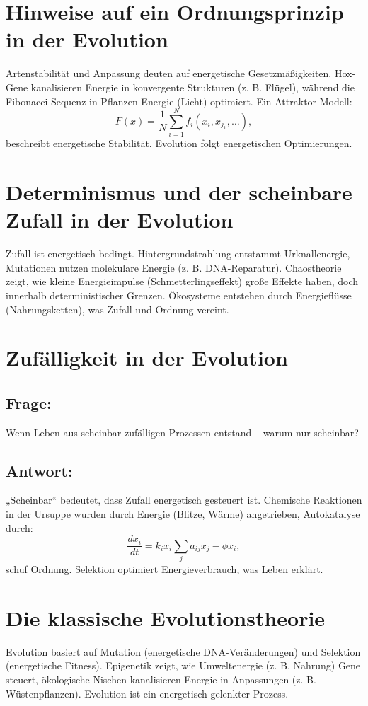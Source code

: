 \documentclass{article}
\begin{document}
	\section{Hinweise auf ein Ordnungsprinzip in der Evolution}
	Artenstabilität und Anpassung deuten auf energetische Gesetzmäßigkeiten. Hox-Gene kanalisieren Energie in konvergente Strukturen (z. B. Flügel), während die Fibonacci-Sequenz in Pflanzen Energie (Licht) optimiert. Ein Attraktor-Modell:
	\begin{equation}
		F(x) = \frac{1}{N} \sum_{i=1}^N f_i(x_i, x_{j_1}, \ldots),
	\end{equation}
	beschreibt energetische Stabilität. Evolution folgt energetischen Optimierungen.
	
	\section{Determinismus und der scheinbare Zufall in der Evolution}
	Zufall ist energetisch bedingt. Hintergrundstrahlung entstammt Urknallenergie, Mutationen nutzen molekulare Energie (z. B. DNA-Reparatur). Chaostheorie zeigt, wie kleine Energieimpulse (Schmetterlingseffekt) große Effekte haben, doch innerhalb deterministischer Grenzen. Ökosysteme entstehen durch Energieflüsse (Nahrungsketten), was Zufall und Ordnung vereint.
	
	\section{Zufälligkeit in der Evolution}
	
	\subsection*{Frage:}
	Wenn Leben aus scheinbar zufälligen Prozessen entstand – warum nur scheinbar?
	
	\subsection*{Antwort:}
	„Scheinbar“ bedeutet, dass Zufall energetisch gesteuert ist. Chemische Reaktionen in der Ursuppe wurden durch Energie (Blitze, Wärme) angetrieben, Autokatalyse durch:
	\begin{equation}
		\frac{dx_i}{dt} = k_i x_i \sum_j a_{ij} x_j - \phi x_i,
	\end{equation}
	schuf Ordnung. Selektion optimiert Energieverbrauch, was Leben erklärt.
	
	\section{Die klassische Evolutionstheorie}
	Evolution basiert auf Mutation (energetische DNA-Veränderungen) und Selektion (energetische Fitness). Epigenetik zeigt, wie Umweltenergie (z. B. Nahrung) Gene steuert, ökologische Nischen kanalisieren Energie in Anpassungen (z. B. Wüstenpflanzen). Evolution ist ein energetisch gelenkter Prozess.
	
\end{document}
